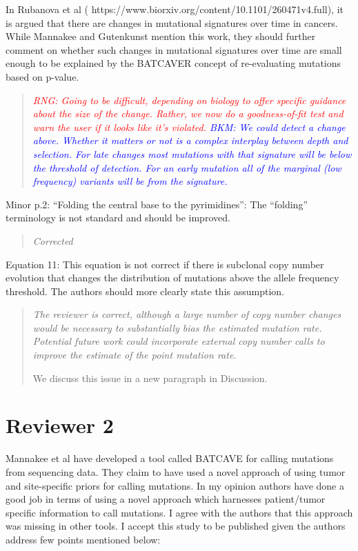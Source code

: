\documentclass[11pt]{article}
\newcommand{\BKM}[1]{\textcolor{blue}{BKM: #1}}
\newcommand{\RNG}[1]{\textcolor{red}{RNG: #1}}
\newenvironment{response}
{\begin{quote}\itshape}
{\end{quote}}
\begin{document}
In Rubanova et al ( https://www.biorxiv.org/content/10.1101/260471v4.full), it is argued that there are changes in mutational signatures over time in cancers. While Mannakee and Gutenkunst mention this work, they should further comment on whether such changes in mutational signatures over time are small enough to be explained by the BATCAVER concept of re-evaluating mutations based on p-value.
\begin{response}
\RNG{Going to be difficult, depending on biology to offer specific guidance about the size of the change. Rather, we now do a goodness-of-fit test and warn the user if it looks like it's violated.}
\BKM{We could detect a change above. Whether it matters or not is a complex interplay between depth and selection. For late changes most mutations with that signature will be below the threshold of detection. For an early mutation all of the marginal (low frequency) variants will be from the signature.}
\end{response}

Minor
p.2: “Folding the central base to the pyrimidines”: The “folding” terminology is not standard and should be improved. 
\begin{response}
Corrected
\end{response}

Equation 11: This equation is not correct if there is subclonal copy number evolution that changes the distribution of mutations above the allele frequency threshold. The authors should more clearly state this assumption.
\begin{response}
The reviewer is correct, although a large number of copy number changes would be necessary to substantially bias the estimated mutation rate.
Potential future work could incorporate external copy number calls to improve the estimate of the point mutation rate.

We discuss this issue in a new paragraph in Discussion.
\end{response}

\section*{Reviewer 2}

Mannakee et al have developed a tool called BATCAVE for calling mutations from sequencing data. They claim to have used a novel approach of using tumor and site-specific priors for calling mutations. In my opinion authors have done a good job in terms of using a novel approach which harnesses patient/tumor specific information to call mutations. I agree with the authors that this approach was missing in other tools. I accept this study to be published given the authors address few points mentioned below:
\end{document}
